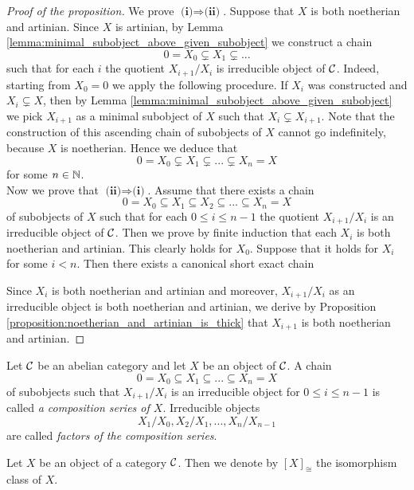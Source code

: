 \begin{proof}[Proof of the proposition]
We prove $\textbf{(i)}\Rightarrow \textbf{(ii)}$. Suppose that $X$ is both noetherian and artinian. Since $X$ is artinian, by Lemma \ref{lemma:minimal_subobject_above_given_subobject} we construct a chain
$$0 = X_0\subsetneq X_1\subsetneq ...$$
such that for each $i$ the quotient $X_{i+1}/X_i$ is irreducible object of ${\mathcal C}$. Indeed, starting from $X_0 = 0$ we apply the following procedure. If $X_i$ was constructed and $X_i\subsetneq X$, then by Lemma \ref{lemma:minimal_subobject_above_given_subobject} we pick $X_{i+1}$ as a minimal subobject of $X$ such that $X_i\subsetneq X_{i+1}$. Note that the construction of this ascending chain of subobjects of $X$ cannot go indefinitely, because $X$ is noetherian. Hence we deduce that
$$0 = X_0\subsetneq X_1\subsetneq ...\subsetneq X_n = X$$
for some $n\in {\mathbb N}$.\\
Now we prove that $\textbf{(ii)}\Rightarrow \textbf{(i)}$. Assume that there exists a chain
$$0=X_0\subseteq X_1\subseteq X_2\subseteq ...\subseteq X_n = X$$
of subobjects of $X$ such that for each $0\leq i\leq n-1$ the quotient $X_{i+1}/X_i$ is an irreducible object of ${\mathcal C}$. Then we prove by finite induction that each $X_i$ is both noetherian and artinian. This clearly holds for $X_0$. Suppose that it holds for $X_i$ for some $i<n$. Then there exists a canonical short exact chain
\begin{center}
\end{center}
Since $X_i$ is both noetherian and artinian and moreover, $X_{i+1}/X_i$ as an irreducible object is both noetherian and artinian, we derive by Proposition \ref{proposition:noetherian_and_artinian_is_thick} that $X_{i+1}$ is both noetherian and artinian.
\end{proof}

\begin{definition}
Let ${\mathcal C}$ be an abelian category and let $X$ be an object of ${\mathcal C}$. A chain
$$0=X_0 \subseteq X_1\subseteq ...\subseteq X_n = X$$
of subobjects such that $X_{i+1}/X_i$ is an irreducible object for $0 \leq i \leq n-1$ is called \textit{a composition series of $X$}. Irreducible objects
$$X_1/X_0,X_2/X_1,...,X_n/X_{n-1}$$
are called \textit{factors of the composition series}.
\end{definition}
\noindent
Let $X$ be an object of a category ${\mathcal C}$. Then we denote by $[X]_{\cong}$ the isomorphism class of $X$.

